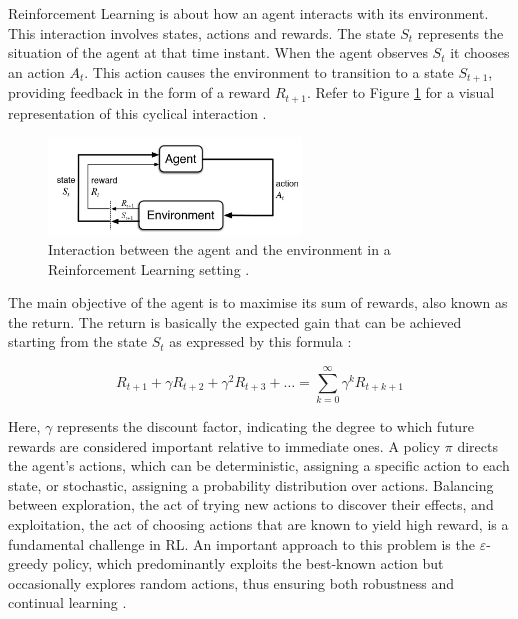 Reinforcement Learning is about how an agent interacts with its environment. This interaction involves states, actions and rewards. The state \( S_t \) represents the situation of the agent at that time instant. When the agent observes \( S_t \) it chooses an action \( A_t \). This action causes the environment to transition to a state \( S_{t+1} \), providing feedback in the form of a reward \( R_{t+1} \). Refer to Figure \ref{Figure:AgentEnvironment} for a visual representation of this cyclical interaction \cite{sutton_reinforcement_2018}. 

\begin{figure}[htb!]
\centering
\includegraphics[width=0.6\textwidth]{Images/AgentEnvironment.png}
\caption{Interaction between the agent and the environment in a Reinforcement Learning setting \cite{sutton_reinforcement_2018}.}
\label{Figure:AgentEnvironment}
\end{figure}

The main objective of the agent is to maximise its sum of rewards, also known as the return. The return is basically the expected gain that can be achieved starting from the state \( S_t \) as expressed by this formula \cite{sutton_reinforcement_2018}:

\begin{equation}
R_{t+1} + \gamma R_{t+2} + \gamma^2 R_{t+3} + \ldots = \sum_{k=0}^{\infty} \gamma^k R_{t+k+1}
\end{equation}

Here, \( \gamma \) represents the discount factor, indicating the degree to which future rewards are considered important relative to immediate ones. A policy \( \pi \) directs the agent's actions, which can be deterministic, assigning a specific action to each state, or stochastic, assigning a probability distribution over actions. Balancing between exploration, the act of trying new actions to discover their effects, and exploitation, the act of choosing actions that are known to yield high reward, is a fundamental challenge in RL. An important approach to this problem is the \(\varepsilon\)-greedy policy, which predominantly exploits the best-known action but occasionally explores random actions, thus ensuring both robustness and continual learning \cite{sutton_reinforcement_2018}.


